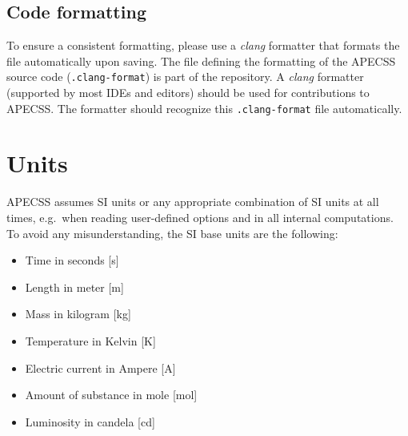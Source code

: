 \subsection{Code formatting}
\label{sec:clang}

To ensure a consistent formatting, please use a \textit{clang} formatter that formats the file automatically upon saving. The file defining the formatting of the APECSS source code ({\tt .clang-format}) is part of the repository. A \textit{clang} formatter (supported by most IDEs and editors) should be used for contributions to APECSS. The formatter should recognize this {\tt .clang-format} file automatically.

\section{Units}

APECSS assumes SI units or any appropriate combination of SI units at all times, e.g.~when reading user-defined options and in all internal computations. To avoid any misunderstanding, the SI base units are the following:\vspace{-1em}
\begin{itemize}[noitemsep]
  \item Time in seconds [s]
  \item Length in meter [m]
  \item Mass in kilogram [kg]
  \item Temperature in Kelvin [K]
  \item Electric current in Ampere [A] 
  \item Amount of substance in mole [mol]
  \item Luminosity in candela [cd]
\end{itemize}

